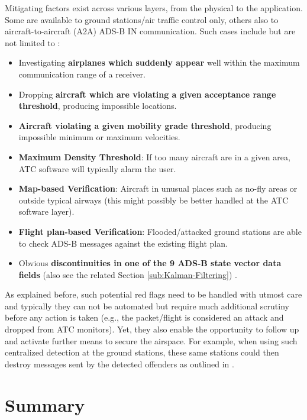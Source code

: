 \documentclass[english]{IEEEtran}
\begin{document}
Mitigating factors exist across various layers, from the physical
to the application. Some are available to ground stations/air traffic
control only, others also to aircraft-to-aircraft (A2A) ADS-B IN communication.
Such cases include but are not limited to \cite{Leinmuller2006}:\\

\begin{itemize}
\item Investigating\textbf{ airplanes which suddenly appear} well within
the maximum communication range of a receiver.
\item Dropping \textbf{aircraft which are violating a given acceptance range
threshold}, producing impossible locations.
\item \textbf{Aircraft violating a given mobility grade threshold}, producing
impossible minimum or maximum velocities.
\item \textbf{Maximum Density Threshold}: If too many aircraft are in a
given area, ATC software will typically alarm the user.
\item \textbf{Map-based Verification}: Aircraft in unusual places such as
no-fly areas or outside typical airways (this might possibly be better
handled at the ATC software layer).
\item \textbf{Flight plan-based Verification}: Flooded/attacked ground stations
are able to check ADS-B messages against the existing flight plan.
\item Obvious \textbf{discontinuities in one of the 9 ADS-B state vector
data fields} (also see the related Section \ref{sub:Kalman-Filtering})
.
\end{itemize}
As explained before, such potential red flags need to be handled with
utmost care and typically they can not be automated but require much
additional scrutiny before any action is taken (e.g., the packet/flight
is considered an attack and dropped from ATC monitors). Yet, they
also enable the opportunity to follow up and activate further means
to secure the airspace. For example, when using such centralized detection
at the ground stations, these same stations could then destroy messages
sent by the detected offenders as outlined in \cite{Martinovic2009,Wilhelm2011}.\\



\section{Summary \label{sec:Summary}}
\end{document}
